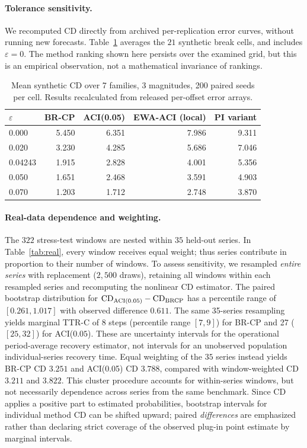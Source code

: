 \documentclass[10pt]{article}
\begin{document}
\paragraph{Tolerance sensitivity.}
We recomputed CD directly from archived per-replication error curves,
without running new forecasts. Table~\ref{tab:eps} averages the $21$
synthetic break cells, and includes $\varepsilon=0$. The method ranking
shown here persists over the examined grid, but this is an empirical
observation, not a mathematical invariance of rankings.
\begin{table}[t]
\centering\small
\caption{Mean synthetic CD over 7 families, 3 magnitudes, 200 paired seeds per
cell. Results recalculated from released per-offset error arrays.}
\label{tab:eps}
\begin{tabular}{lrrrr}
\toprule
$\varepsilon$ & BR-CP & ACI(0.05) & EWA-ACI (local) & PI variant \\
\midrule
0.000 & 5.450 & 6.351 & 7.986 & 9.311 \\
0.020 & 3.230 & 4.285 & 5.686 & 7.046 \\
0.04243 & 1.915 & 2.828 & 4.001 & 5.356 \\
0.050 & 1.651 & 2.468 & 3.591 & 4.903 \\
0.070 & 1.203 & 1.712 & 2.748 & 3.870 \\
\bottomrule
\end{tabular}
\end{table}

\paragraph{Real-data dependence and weighting.}
The $322$ stress-test windows are nested within $35$ held-out series. In
Table~\ref{tab:real}, every window receives equal weight; thus series
contribute in proportion to their number of windows. To assess sensitivity,
we resampled \emph{entire series} with replacement ($2{,}500$ draws),
retaining all windows within each resampled series and recomputing the
nonlinear CD estimator. The paired bootstrap distribution for
$\mathrm{CD}_{\rm ACI(0.05)}-\mathrm{CD}_{\rm BRCP}$ has a percentile
range of $[0.261,1.017]$ with observed difference $0.611$. The same
35-series resampling yields marginal TTR-C of 8 steps (percentile range
$[7,9]$) for BR-CP and 27 ($[25,32]$) for ACI($0.05$).
These are uncertainty intervals for the operational period-average recovery
estimator, not intervals for an unobserved population individual-series
recovery time.
Equal weighting of the $35$ series instead yields BR-CP CD $3.251$
and ACI(0.05) CD $3.788$, compared with window-weighted CD $3.211$
and $3.822$. This cluster procedure accounts for within-series windows,
but not necessarily dependence across series from the same benchmark.
Since CD applies a positive part to estimated probabilities, bootstrap
intervals for individual method CD can be shifted upward; paired
\emph{differences} are emphasized rather than declaring strict coverage
of the observed plug-in point estimate by marginal intervals.
\end{document}
